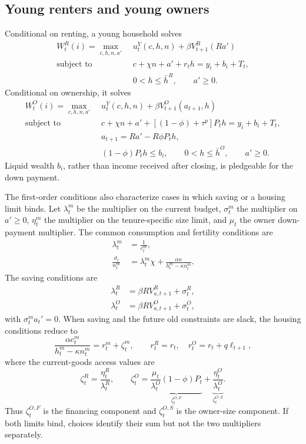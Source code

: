 \documentclass[11pt]{article}
\theoremstyle{definition}
\theoremstyle{remark}
\begin{document}
\subsection{Young renters and young owners}

Conditional on renting, a young household solves
\begin{align}
 W_t^R(i)=\max_{c,h,n,a'}\;&u_t^Y(c,h,n)+\beta V_{t+1}^R(Ra')
 \label{eq:young_renter_app}\\
 \text{subject to}\quad&
 c+\chi n+a'+r_th=y_i+b_i+T_t,\nonumber\\
 &0<h\leq\bar h^R,\qquad a'\geq0.\nonumber
\end{align}
Conditional on ownership, it solves
\begin{align}
 W_t^O(i)=\max_{c,h,n,a'}\;&u_t^Y(c,h,n)
 +\beta V_{t+1}^O(a_{t+1},h)
 \label{eq:young_owner_app}\\
 \text{subject to}\quad&
 c+\chi n+a'+[(1-\phi)+\tau^p]P_th=y_i+b_i+T_t,\nonumber\\
 &a_{t+1}=Ra'-R\phi P_th,\nonumber\\
 &(1-\phi)P_th\leq b_i,\qquad
 0<h\leq\bar h^O,\qquad a'\geq0.\nonumber
\end{align}
Liquid wealth $b_i$, rather than income received after closing, is pledgeable
for the down payment.

The first-order conditions also characterize cases in which saving or a
housing limit binds.  Let $\lambda_t^m$ be the multiplier on the current budget,
$\sigma_t^m$ the multiplier on $a'\geq0$, $\eta_t^m$ the multiplier on the
tenure-specific size limit, and $\mu_t$ the owner down-payment multiplier.  The
common consumption and fertility conditions are
\begin{align}
 \lambda_t^m&=\frac1{c_t^m},
 \label{eq:young_lambda}\\
 \frac{\vartheta_t}{n_t^m}
 &=\lambda_t^m\chi+
   \frac{\alpha\kappa}{h_t^m-\kappa n_t^m}.
 \label{eq:young_n_kkt}
\end{align}
The saving conditions are
\begin{align}
 \lambda_t^R&=\beta R V_{a,t+1}^R+\sigma_t^R,
 \label{eq:renter_saving_kkt}\\
 \lambda_t^O&=\beta R V_{a,t+1}^O+\sigma_t^O,
 \label{eq:owner_saving_kkt}
\end{align}
with $\sigma_t^ma_t'=0$.  When saving and the future old constraints are slack,
the housing conditions reduce to
\begin{equation}
 \frac{\alpha c_t^m}{h_t^m-\kappa n_t^m}
 =r_t^m+\zeta_t^m,
 \qquad r_t^R=r_t,\quad r_t^O=r_t+q\ell_{t+1},
 \label{eq:young_housing_kkt}
\end{equation}
where the current-goods access values are
\begin{equation}
 \zeta_t^R=\frac{\eta_t^R}{\lambda_t^R},\qquad
 \zeta_t^O=
 \underbrace{\frac{\mu_t}{\lambda_t^O}(1-\phi)P_t}_{\zeta_t^{O,F}}
 +\underbrace{\frac{\eta_t^O}{\lambda_t^O}}_{\zeta_t^{O,S}}.
 \label{eq:zeta_app}
\end{equation}
Thus $\zeta_t^{O,F}$ is the financing component and $\zeta_t^{O,S}$ is the
owner-size component.  If both limits bind, choices identify their sum but not
the two multipliers separately.
\end{document}
